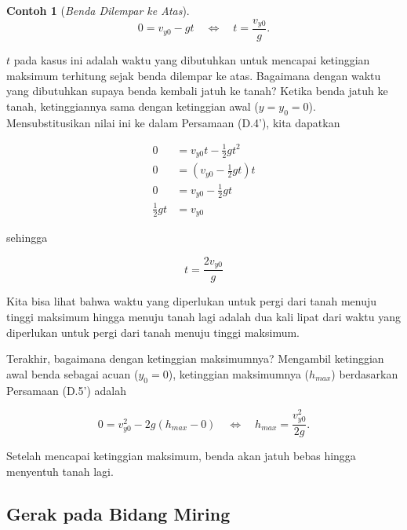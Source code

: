 \documentclass[12pt, a4paper]{article}\usepackage[utf8]{inputenc}
\theoremstyle{plain}
\theoremstyle{plain}
\numberwithin{equation}{section}
\theoremstyle{definition}
\newtheorem{contoh}[teorema]{Contoh}
\begin{document}
\begin{contoh}[\emph{Benda Dilempar ke Atas}]
		\begin{equation}
			0 = v_{y0} - g t \quad \Longleftrightarrow \quad t = \frac{v_{y0}}{g}.
		\end{equation}
		
		$t$ pada kasus ini adalah waktu yang dibutuhkan untuk mencapai ketinggian maksimum terhitung sejak benda dilempar ke atas. Bagaimana dengan waktu yang dibutuhkan supaya benda kembali jatuh ke tanah? Ketika benda jatuh ke tanah, ketinggiannya sama dengan ketinggian awal ($y = y_0 = 0$). Mensubstitusikan nilai ini ke dalam Persamaan (D.4'), kita dapatkan
		
		\vspace{-1em}
		\begin{align*}
			0 &= v_{y0} t - \frac{1}{2} g t^2\\
			0 &= (v_{y0} - \frac{1}{2} gt)t\\
			0 &= v_{y0} - \frac{1}{2} gt\\
			\frac{1}{2} gt &= v_{y0}
		\end{align*}
		
		sehingga
		
		\vspace{-1em}
		\begin{equation}
			t = \frac{2v_{y0}}{g}
		\end{equation}
		
		Kita bisa lihat bahwa waktu yang diperlukan untuk pergi dari tanah menuju tinggi maksimum hingga menuju tanah lagi adalah dua kali lipat dari waktu yang diperlukan untuk pergi dari tanah menuju tinggi maksimum.
		
		Terakhir, bagaimana dengan ketinggian maksimumnya? Mengambil ketinggian awal benda sebagai acuan ($y_0 = 0$), ketinggian maksimumnya ($h_{max}$) berdasarkan Persamaan (D.5') adalah
		
		\vspace{-.5em}
		\begin{equation}
			0 = v_{y0}^2 - 2g(h_{max} - 0) \quad \Longleftrightarrow \quad h_{max} = \frac{v_{y0}^2}{2g}.
		\end{equation}
	
		Setelah mencapai ketinggian maksimum, benda akan jatuh bebas hingga menyentuh tanah lagi.
	\end{contoh}
	
	
	
	\subsection{Gerak pada Bidang Miring}
	
\end{document}

